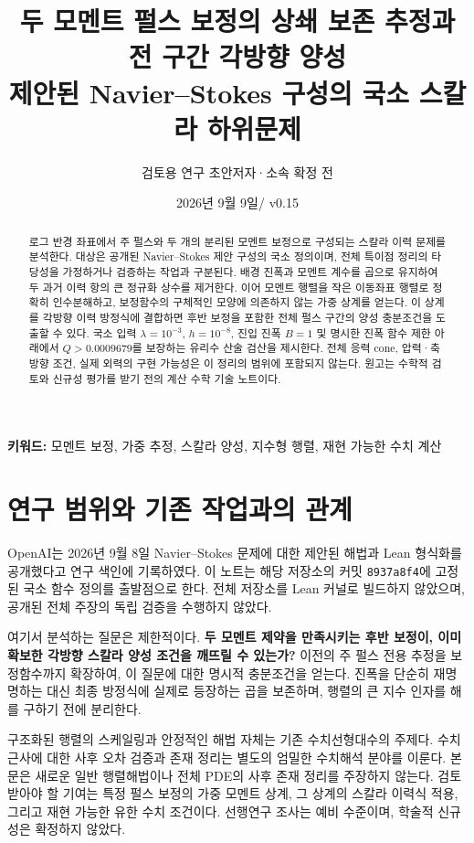 \documentclass[11pt,a4paper]{article}
\title{\bfseries 두 모멘트 펄스 보정의 상쇄 보존 추정과\\전 구간 각방향 양성\\[6pt]
\large 제안된 Navier--Stokes 구성의 국소 스칼라 하위문제}
\author{검토용 연구 초안\quad\textnormal{저자·소속 확정 전}}
\date{2026년 9월 9일\quad / \quad v0.15}
\theoremstyle{definition}
\theoremstyle{remark}\newtheorem{remark}[theorem]{주의}
\begin{document}
\maketitle
\begin{abstract}
로그 반경 좌표에서 주 펄스와 두 개의 분리된 모멘트 보정으로 구성되는 스칼라 이력 문제를 분석한다. 대상은 공개된 Navier--Stokes 제안 구성의 국소 정의이며, 전체 특이점 정리의 타당성을 가정하거나 검증하는 작업과 구분된다. 배경 진폭과 모멘트 계수를 곱으로 유지하여 두 과거 이력 항의 큰 정규화 상수를 제거한다. 이어 모멘트 행렬을 작은 이동좌표 행렬로 정확히 인수분해하고, 보정함수의 구체적인 모양에 의존하지 않는 가중 상계를 얻는다. 이 상계를 각방향 이력 방정식에 결합하면 후반 보정을 포함한 전체 펄스 구간의 양성 충분조건을 도출할 수 있다. 국소 입력 $\lambda=10^{-3}$, $h=10^{-8}$, 진입 진폭 $B=1$ 및 명시한 진폭 함수 제한 아래에서 $Q>0.0009679$를 보장하는 유리수 산술 검산을 제시한다. 전체 응력 cone, 압력·축방향 조건, 실제 외력의 구현 가능성은 이 정리의 범위에 포함되지 않는다. 원고는 수학적 검토와 신규성 평가를 받기 전의 계산 수학 기술 노트이다.
\end{abstract}
\noindent\textbf{키워드:} 모멘트 보정, 가중 추정, 스칼라 양성, 지수형 행렬, 재현 가능한 수치 계산

\section{연구 범위와 기존 작업과의 관계}
OpenAI는 2026년 9월 8일 Navier--Stokes 문제에 대한 제안된 해법과 Lean 형식화를 공개했다고 연구 색인에 기록하였다\cite{announcement}. 이 노트는 해당 저장소의 커밋 \texttt{8937a8f4}에 고정된 국소 함수 정의를 출발점으로 한다\cite{schedule,repair,cone}. 전체 저장소를 Lean 커널로 빌드하지 않았으며, 공개된 전체 주장의 독립 검증을 수행하지 않았다.

여기서 분석하는 질문은 제한적이다. \textbf{두 모멘트 제약을 만족시키는 후반 보정이, 이미 확보한 각방향 스칼라 양성 조건을 깨뜨릴 수 있는가?} 이전의 주 펄스 전용 추정을 보정함수까지 확장하여, 이 질문에 대한 명시적 충분조건을 얻는다. 진폭을 단순히 재명명하는 대신 최종 방정식에 실제로 등장하는 곱을 보존하며, 행렬의 큰 지수 인자를 해를 구하기 전에 분리한다.

구조화된 행렬의 스케일링과 안정적인 해법 자체는 기존 수치선형대수의 주제다\cite{higham}. 수치 근사에 대한 사후 오차 검증과 존재 정리는 별도의 엄밀한 수치해석 분야를 이룬다\cite{lessard}. 본문은 새로운 일반 행렬해법이나 전체 PDE의 사후 존재 정리를 주장하지 않는다. 검토받아야 할 기여는 특정 펄스 보정의 가중 모멘트 상계, 그 상계의 스칼라 이력식 적용, 그리고 재현 가능한 유한 수치 조건이다. 선행연구 조사는 예비 수준이며, 학술적 신규성은 확정하지 않았다.
\end{document}
